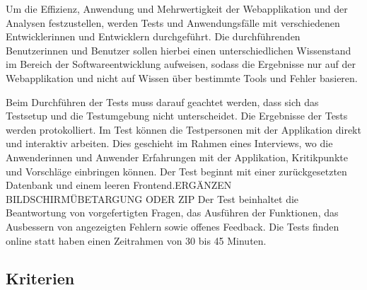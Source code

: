Um die Effizienz, Anwendung und Mehrwertigkeit der Webapplikation und der Analysen festzustellen, werden Tests und Anwendungsfälle mit verschiedenen Entwicklerinnen und Entwicklern durchgeführt. Die durchführenden Benutzerinnen und Benutzer sollen hierbei einen unterschiedlichen Wissenstand im Bereich der Softwareentwicklung aufweisen, sodass die Ergebnisse nur auf der Webapplikation und nicht auf Wissen über bestimmte Tools und Fehler basieren. 


Beim Durchführen der Tests muss darauf geachtet werden, dass sich das Testsetup und die Testumgebung nicht unterscheidet. Die Ergebnisse der Tests werden protokolliert. Im Test können die Testpersonen mit der Applikation direkt und interaktiv arbeiten. Dies geschieht im Rahmen eines Interviews, wo die Anwenderinnen und Anwender Erfahrungen mit der Applikation, Kritikpunkte und Vorschläge einbringen können. Der Test beginnt mit einer zurückgesetzten Datenbank und einem leeren Frontend.ERGÄNZEN BILDSCHIRMÜBETARGUNG ODER ZIP
Der Test beinhaltet die Beantwortung von vorgefertigten Fragen, das Ausführen der Funktionen, das Ausbessern von angezeigten Fehlern sowie offenes Feedback.
Die Tests finden online statt haben einen Zeitrahmen von 30 bis 45 Minuten. 
\subsection{Kriterien} 
